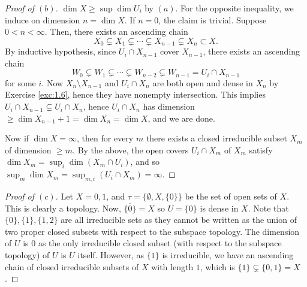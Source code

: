 \documentclass[12pt,letterpaper]{article}
\theoremstyle{definition}
\theoremstyle{remark}
\numberwithin{equation}{section}
\numberwithin{figure}{problem}
\begin{document}
\begin{proof}[Proof of $(b)$]
  $\dim X \ge \sup \dim U_i$ by $(a)$.
  For the opposite inequality, we induce on dimension $n = \dim X$.
  If $n = 0$, the claim is trivial.
  Suppose $0 < n < \infty$. Then, there exists an ascending chain
  \begin{equation*}
    X_0 \subsetneq X_1 \subsetneq\cdots \subsetneq X_{n-1} \subsetneq X_n
    \subset X.
  \end{equation*}
  By inductive hypothesis, since $U_i \cap X_{n-1}$ cover $X_{n-1}$, there
  exists an ascending chain
  \begin{equation*}
    W_0 \subsetneq W_1 \subsetneq \cdots \subsetneq W_{n-2} \subsetneq W_{n-1}
    = U_i \cap X_{n-1}
  \end{equation*}
  for some $i$. Now $X_n \setminus X_{n-1}$ and $U_i \cap X_n$ are both open and
  dense in $X_n$ by Exercise \ref{exc:1.6}, hence they have nonempty
  intersection.
  This implies $U_i \cap X_{n-1} \subsetneq U_i \cap X_n$, hence $U_i \cap X_n$
  has dimension $\ge \dim X_{n-1} + 1 = \dim X_n = \dim X$, and we are done.
  \par Now if $\dim X = \infty$, then for every $m$ there exists a closed
  irreducible subset $X_m$ of dimension $\ge m$. By the above, the open covers $U_i
  \cap X_m$ of $X_m$ satisfy $\dim X_m = \sup_i\dim (X_m \cap U_i)$, and so
  $\sup_m \dim X_m = \sup_{m,i}(U_i \cap X_m) = \infty$.
\end{proof}
\begin{proof}[Proof of $(c)$]
	Let $X = {0,1}$, and $\tau = \{ \emptyset, X, \{0\}\}$ be the set of open sets of $X$.
  This is clearly a topology. 
	Now, $\overline{\{0\}} = X$ so $U = \{0\}$ is dense in $X$.
  Note that $\{0\},\{1\},\{1,2\}$ are all irreducible sets as they cannot be
  written as the union of two proper closed subsets with respect to the subspace
  topology.
	The dimension of $U$ is $0$ as the only irreducible closed subset (with respect
  to the subspace topology) of $U$ is $U$ itself. However, as $\{1\}$ is
  irreducible, we have an ascending chain of closed irreducible subsets of
  $X$ with length $1$, which is $\{1\} \subsetneq \{0,1\} = X$.  
\end{proof}
\end{document}
